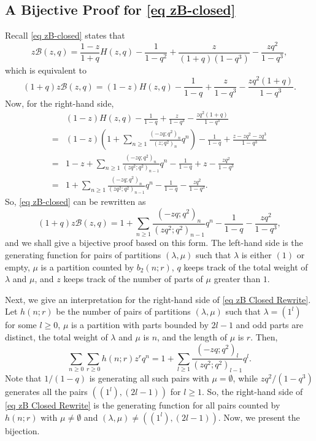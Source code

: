 \documentclass[reqno]{amsart}
\theoremstyle{definition}
\theoremstyle{plain}
\theoremstyle{remark}
\numberwithin{equation}{section}
\begin{document}
\subsection{A Bijective Proof for \eqref{eq zB-closed}} Recall \eqref{eq zB-closed} states that
\begin{equation*}
z\mathcal B(z,q)=\frac{1-z}{1+q}H(z,q)-\frac{1}{1-q^2}
+\frac{z}{(1+q)(1-q^3)}-\frac{zq^2}{1-q^3},   
\end{equation*}
which is equivalent to
\begin{equation*}
(1+q)z\mathcal{B}(z,q)=(1-z)H(z,q)-\frac{1}{1-q}+\frac{z}{1-q^3}-\frac{zq^2(1+q)}{1-q^3}.
\end{equation*}
Now, for the right-hand side,
\begin{align*}
&(1-z)H(z,q)-\frac{1}{1-q}+\frac{z}{1-q^3}-\frac{zq^2(1+q)}{1-q^3}\\
=&(1-z)\left(1+\sum_{n\geq1}\frac{(-zq;q^2)_n}{(z;q^2)_n}q^n\right)-\frac{1}{1-q}+\frac{z-zq^2-zq^3}{1-q^3}\\
=&1-z+\sum_{n\geq1}\frac{(-zq;q^2)_n}{(zq^2;q^2)_{n-1}}q^n-\frac{1}{1-q}+z-\frac{zq^2}{1-q^3}\\
=&1+\sum_{n\geq1}\frac{(-zq;q^2)_n}{(zq^2;q^2)_{n-1}}q^n-\frac{1}{1-q}-\frac{zq^2}{1-q^3}.
\end{align*}
So, \eqref{eq zB-closed} can be rewritten as
\begin{equation}\label{eq zB Closed Rewrite}
(1+q)z\mathcal{B}(z,q)=1+\sum_{n\geq1}\frac{(-zq;q^2)_n}{(zq^2;q^2)_{n-1}}q^n-\frac{1}{1-q}-\frac{zq^2}{1-q^3},   
\end{equation}
and we shall give a bijective proof based on this form. The left-hand side is the generating function for pairs of partitions $(\lambda,\mu)$ such that $\lambda$ is either $(1)$ or empty, $\mu$ is a partition counted by $b_2(n;r)$, $q$ keeps track of the total weight of $\lambda$ and $\mu$, and $z$ keeps track of the number of parts of $\mu$ greater than $1$.

Next, we give an interpretation for the right-hand side of \eqref{eq zB Closed Rewrite}. Let $h(n;r)$ be the number of pairs of partitions $(\lambda,\mu)$ such that $\lambda=(1^l)$ for some $l\geq0$, $\mu$ is a partition with parts bounded by $2l-1$ and odd parts are distinct, the total weight of $\lambda$ and $\mu$ is $n$, and the length of $\mu$ is $r$. Then,
$$\sum_{n\geq0}\sum_{r\geq0}h(n;r)z^rq^{n}=1+\sum_{l\geq1}\frac{(-zq;q^2)_l}{(zq^2;q^2)_{l-1}}q^{l}.$$
Note that $1/(1-q)$ is generating all such pairs with $\mu=\emptyset$, while $zq^2/(1-q^3)$ generates all the pairs $((1^l),(2l-1))$ for $l\geq1$. So, the right-hand side of \eqref{eq zB Closed Rewrite} is the generating function for all pairs counted by $h(n;r)$ with $\mu\neq\emptyset$ and $(\lambda,\mu)\neq((1^l),(2l-1))$. Now, we present the bijection.
\end{document}
